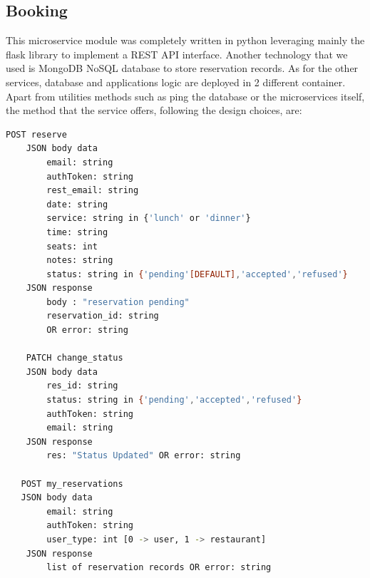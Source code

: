 \subsection{Booking}
This microservice module was completely written in python leveraging mainly the flask library to implement a REST API interface. Another technology that we used is MongoDB NoSQL database to store reservation records. As for the other services, database and applications logic are deployed in 2 different container. Apart from utilities methods such as ping the database or the microservices itself, the method that the service offers, following the design choices, are:

\begin{lstlisting}[language=bash,caption={Booking exposed API}]
    POST reserve
    JSON body data
        email: string
        authToken: string
        rest_email: string
        date: string
        service: string in {'lunch' or 'dinner'}
        time: string
        seats: int
        notes: string
        status: string in {'pending'[DEFAULT],'accepted','refused'}
    JSON response
    	body : "reservation pending"
        reservation_id: string
        OR error: string
        
    PATCH change_status
    JSON body data
        res_id: string
        status: string in {'pending','accepted','refused'}
        authToken: string
        email: string        
    JSON response
        res: "Status Updated" OR error: string
        
   POST my_reservations
   JSON body data
        email: string
        authToken: string
        user_type: int [0 -> user, 1 -> restaurant]
    JSON response
        list of reservation records OR error: string
\end{lstlisting}


